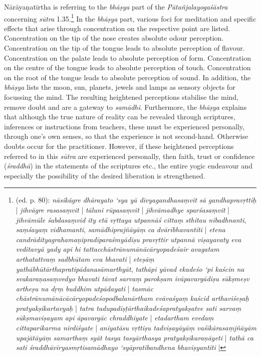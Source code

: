   Nārāyaṇatīrtha is referring to the \textit{bhāṣya} part of the \textit{Pātañjalayogaśāstra} concerning \textit{sūtra} 1.35.\footnote{ (ed. p. 80): \textit{nāsikāgre dhārayato ‘sya yā divyagandhasaṃvit sā gandhapravṛttiḥ} | \textit{jihvāgre rasasaṃvit} | \textit{tāluni rūpasaṃvit} | \textit{jihvāmadhye sparśasaṃvit} | \textit{jihvāmūle śabdasaṃvid ity etā vṛttaya utpannāś cittaṃ sthitau nibadhnanti}, \textit{saṃśayaṃ vidhamanti}, \textit{samādhiprajñāyāṃ ca dvārībhavantīti} | \textit{etena candrādityagrahamaṇipradīparaśmyādiṣu pravṛttir utpannā viṣayavaty eva veditavyā yady api hi tattacchāstrānumānācāryopadeśair avagatam arthatattvaṃ sadbhūtam eva bhavati} | \textit{eteṣāṃ yathābhūtārthapratipādanasāmarthyāt}, \textit{tathāpi yāvad ekadeśo ‘pi kaścin na svakaraṇasaṃvedyo bhavati tāvat sarvaṃ parokṣam ivāpavargādiṣu sūkṣmeṣv artheṣu na dṛṃ buddhim utpādayati} | \textit{tasmāc chāstrānumānācācāryopadeśopodbalanārtham evāvaśyaṃ kaścid arthaviśeṣaḥ pratyakṣīkartavyaḥ} | \textit{tatra tadupadiṣṭārthaikadeśapratyakṣatve sati sarvaṃ sūkṣmaviṣayam api āpavargāc chraddhīyate} | \textit{etadartham evedaṃ cittaparikarma nirdiśyate} | \textit{aniyatāsu vṛttiṣu tadviṣayāyāṃ vaśīkārasaṃjñāyām upajātāyāṃ samarthaṃ syāt tasya tasyārthasya pratyakṣīkaraṇāyeti} | \textit{tathā ca sati śraddhāvīryasmṛtisamādhayo ‘syāpratibandhena bhaviṣyantīti} |} In the \textit{bhāṣya} part, various foci for meditation and specific effects that arise through concentration on the respective point are listed. Concentration on the tip of the nose creates absolute odour perception. Concentration on the tip of the tongue leads to absolute perception of flavour. Concentration on the palate leads to absolute perception of form. Concentration on the centre of the tongue leads to absolute perception of touch. Concentration on the root of the tongue leads to absolute perception of sound. In addition, the \textit{bhāṣya} lists the moon, sun, planets, jewels and lamps as sensory objects for focussing the mind. The resulting heightened perceptions stabilise the mind, remove doubt and are a gateway to \textit{samādhi}. Furthermore, the \textit{bhāṣya} explains that although the true nature of reality can be revealed through scriptures, inferences or instructions from teachers, these must be experienced personally, through one's own senses, so that the experience is not second-hand. Otherwise doubts occur for the practitioner. However, if these heightened perceptions referred to in this \textit{sūtra} are experienced personally, then faith, trust or confidence (\textit{śraddhā}) in the statements of the scriptures etc., the entire yogic endeavour and especially the possibility of the desired liberation is strengthened.


